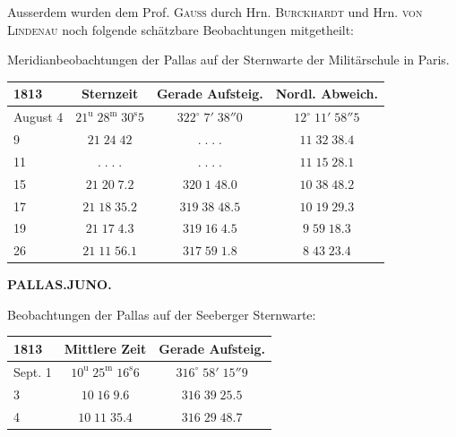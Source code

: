 \par\indent Ausserdem wurden dem Prof. \textsc{Gauss} durch Hrn. \textsc{Burckhardt} und Hrn.
\textsc{von Lindenau} noch folgende schätzbare Beobachtungen mitgetheilt:

\begin{center}Meridianbeobachtungen der Pallas auf der Sternwarte der Militärschule in Paris.\end{center}
\begin{center}\fontsize{10}{12}\selectfont\setlength{\tabcolsep}{5pt}\renewcommand{\arraystretch}{1.15}\begin{tabular}{l|c|c|c}
1813 & Sternzeit & Gerade Aufsteig. & Nordl. Abweich.\\\hline
August 4 & $21^{\mathrm u}\;28^{\mathrm m}\;30^{\mathrm s}5$ & $322^\circ\;7'\;38''0$ & $12^\circ\;11'\;58''5$\\
9 & $21\;24\;42$ & $.\;.\;.\;.$ & $11\;32\;38.4$\\
11 & $.\;.\;.\;.$ & $.\;.\;.\;.$ & $11\;15\;28.1$\\
15 & $21\;20\;7.2$ & $320\;1\;48.0$ & $10\;38\;48.2$\\
17 & $21\;18\;35.2$ & $319\;38\;48.5$ & $10\;19\;29.3$\\
19 & $21\;17\;4.3$ & $319\;16\;4.5$ & $9\;59\;18.3$\\
26 & $21\;11\;56.1$ & $317\;59\;1.8$ & $8\;43\;23.4$\\
\end{tabular}\end{center}

\clearpage
\thispagestyle{empty}
\noindent{}%
%
\parbox[t]{\dimexpr\linewidth-24mm\relax}{\centering\footnotesize\bfseries PALLAS.\enspace JUNO.\par}%
\makebox[12mm][r]{}\par\nobreak\medskip
{}\begin{center}Beobachtungen der Pallas auf der Seeberger Sternwarte:\end{center}

\begin{center}\fontsize{10}{12}\selectfont\setlength{\tabcolsep}{5pt}\renewcommand{\arraystretch}{1.15}\begin{tabular}{l|c|c}
1813 & Mittlere Zeit & Gerade Aufsteig.\\\hline
Sept. 1 & $10^{\mathrm u}\;25^{\mathrm m}\;16^{\mathrm s}6$ & $316^\circ\;58'\;15''9$\\
3 & $10\;16\;9.6$ & $316\;39\;25.5$\\
4 & $10\;11\;35.4$ & $316\;29\;48.7$\\
\end{tabular}\end{center}


